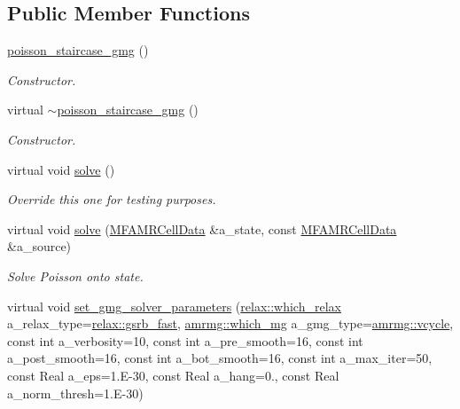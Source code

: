 \subsection*{Public Member Functions}
\begin{DoxyCompactItemize}
\item 
\hyperlink{classpoisson__staircase__gmg_a27a401c7f01af98004a0df448621bb36}{poisson\+\_\+staircase\+\_\+gmg} ()
\begin{DoxyCompactList}\small\item\em Constructor. \end{DoxyCompactList}\item 
virtual \hyperlink{classpoisson__staircase__gmg_a0836d81e083077e620f921d2b3a8c5c3}{$\sim$poisson\+\_\+staircase\+\_\+gmg} ()
\begin{DoxyCompactList}\small\item\em Constructor. \end{DoxyCompactList}\item 
virtual void \hyperlink{classpoisson__staircase__gmg_aba5d2df92bec25833275a99cdd33ef26}{solve} ()
\begin{DoxyCompactList}\small\item\em Override this one for testing purposes. \end{DoxyCompactList}\item 
virtual void \hyperlink{classpoisson__staircase__gmg_a0b3110624d363a4177c7dd1685908bac}{solve} (\hyperlink{type__definitions_8H_aced885351d40daa466564acbee4042d3}{M\+F\+A\+M\+R\+Cell\+Data} \&a\+\_\+state, const \hyperlink{type__definitions_8H_aced885351d40daa466564acbee4042d3}{M\+F\+A\+M\+R\+Cell\+Data} \&a\+\_\+source)
\begin{DoxyCompactList}\small\item\em Solve Poisson onto state. \end{DoxyCompactList}\item 
virtual void \hyperlink{classpoisson__staircase__gmg_a5743fab82b42072fb1bbd4a738cbb561}{set\+\_\+gmg\+\_\+solver\+\_\+parameters} (\hyperlink{namespacerelax_a1b017edf55c06d103aa5b61e015fe219}{relax\+::which\+\_\+relax} a\+\_\+relax\+\_\+type=\hyperlink{namespacerelax_a1b017edf55c06d103aa5b61e015fe219a9f7cf3af97cc2038d3aceba1dbd02c7b}{relax\+::gsrb\+\_\+fast}, \hyperlink{namespaceamrmg_aa3e75c1253c968e52106305f762a7952}{amrmg\+::which\+\_\+mg} a\+\_\+gmg\+\_\+type=\hyperlink{namespaceamrmg_aa3e75c1253c968e52106305f762a7952abcef3ebc4ac4f095d5cf0e2e2b35c23e}{amrmg\+::vcycle}, const int a\+\_\+verbosity=10, const int a\+\_\+pre\+\_\+smooth=16, const int a\+\_\+post\+\_\+smooth=16, const int a\+\_\+bot\+\_\+smooth=16, const int a\+\_\+max\+\_\+iter=50, const Real a\+\_\+eps=1.E-\/30, const Real a\+\_\+hang=0., const Real a\+\_\+norm\+\_\+thresh=1.E-\/30)

\end{DoxyCompactItemize}
